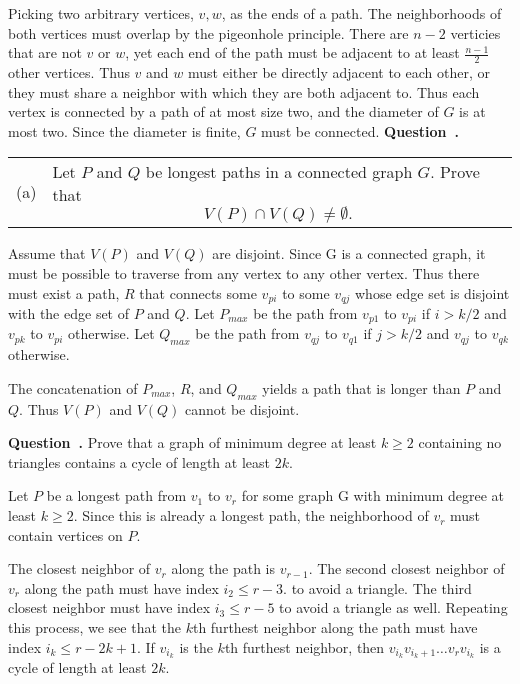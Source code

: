 \documentclass[12pt]{article}
\newcounter{question}[section]
\newenvironment{question}{\refstepcounter{question}\textbf{Question~\thequestion.}}{\bigskip}
\begin{document}
Picking two arbitrary vertices, $v, w$, as the ends of a path.
The neighborhoods of both vertices must overlap by the pigeonhole principle.
There are $n-2$ verticies that are not $v$ or $w$, yet each end of the path
must be adjacent to at least $\frac{n-1}{2}$ other vertices.
Thus $v$ and $w$ must either be directly adjacent to each other,
or they must share a neighbor with which they are both adjacent to.
Thus each vertex is connected by a path of at most size two,
and the diameter of $G$ is at most two.
Since the diameter is finite, $G$ must be connected.
\newpage
\begin{question}

\smallskip

\begin{tabular}{lp{5.5in}}
(a) & Let $P$ and $Q$ be longest paths in a connected graph $G$. Prove that
\[ V(P) \cap V(Q) \neq \emptyset.\] \vspace{-0.2in} 
\end{tabular}
\end{question}

Assume that $V(P)$ and $V(Q)$ are disjoint.
Since G is a connected graph, 
it must be possible to traverse from any vertex to any other vertex.
Thus there must exist a path, $R$ that connects some $v_{pi}$ to some $v_{qj}$
whose edge set is disjoint with the edge set of $P$ and $Q$.
Let $P_{max}$ be the path from $v_{p1}$ to $v_{pi}$ if $i>k/2$ and $v_{pk}$ to $v_{pi}$ otherwise.
Let $Q_{max}$ be the path from $v_{qj}$ to $v_{q1}$ if $j>k/2$ and $v_{qj}$ to $v_{qk}$ otherwise.

The concatenation of $P_{max}$, $R$, and $Q_{max}$ yields a path that is longer than
$P$ and $Q$. Thus $V(P)$ and $V(Q)$ cannot be disjoint.
\newpage

\begin{question}
Prove that a graph of minimum degree at least $k \geq 2$ containing no triangles contains a cycle of length at least $2k$.
\end{question}

Let $P$ be a longest path from $v_1$ to $v_r$ for some graph G
 with minimum degree at least $k \geq 2$.
Since this is already a longest path, the neighborhood of $v_r$
must contain vertices on $P$.

The closest neighbor of $v_r$ along the path is $v_{r-1}$.
The second closest neighbor of $v_r$ along the path must have index $i_2 \leq r-3$.
to avoid a triangle.
The third closest neighbor must have index $i_3 \leq r-5$ to avoid a triangle as well.
Repeating this process, we see that the $k$th furthest neighbor along the path
must have index $i_k \leq r-2k+1$.
If $v_{i_k}$ is the $k$th furthest neighbor, then $v_{i_k}v_{i_k+1}\hdots v_rv_{i_k}$
is a cycle of length at least $2k$.
\end{document}
